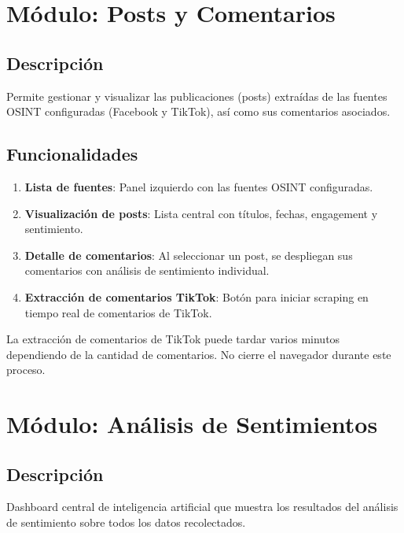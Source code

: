 \documentclass[12pt,a4paper]{article}
\begin{document}
\section{Módulo: Posts y Comentarios}

\subsection{Descripción}
Permite gestionar y visualizar las publicaciones (posts) extraídas de las fuentes OSINT configuradas (Facebook y TikTok), así como sus comentarios asociados.

\subsection{Funcionalidades}
\begin{enumerate}
  \item \textbf{Lista de fuentes}: Panel izquierdo con las fuentes OSINT configuradas.
  \item \textbf{Visualización de posts}: Lista central con títulos, fechas, engagement y sentimiento.
  \item \textbf{Detalle de comentarios}: Al seleccionar un post, se despliegan sus comentarios con análisis de sentimiento individual.
  \item \textbf{Extracción de comentarios TikTok}: Botón para iniciar scraping en tiempo real de comentarios de TikTok.
\end{enumerate}

\begin{warningbox}
La extracción de comentarios de TikTok puede tardar varios minutos dependiendo de la cantidad de comentarios. No cierre el navegador durante este proceso.
\end{warningbox}

\section{Módulo: Análisis de Sentimientos}

\subsection{Descripción}
Dashboard central de inteligencia artificial que muestra los resultados del análisis de sentimiento sobre todos los datos recolectados.
\end{document}

